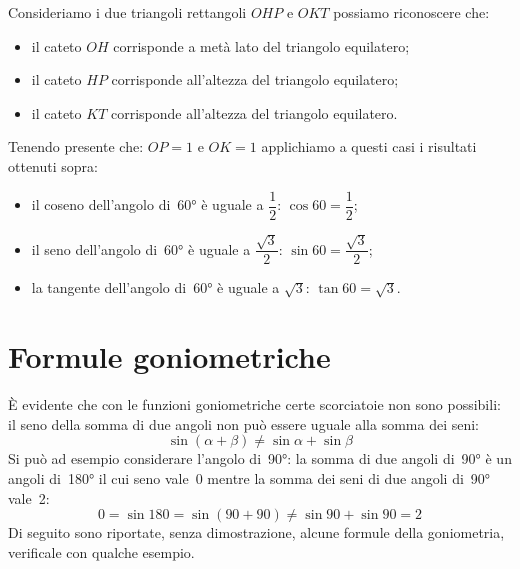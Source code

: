  \begin{minipage}{.45\textwidth}
  \begin{center}
\begin{inaccessibleblock}
\angolosessanta
%     
\end{inaccessibleblock}
  \end{center}
 \end{minipage}
 \begin{minipage}{.45\textwidth}
Consideriamo i due triangoli rettangoli \(OHP\) e \(OKT\) possiamo 
riconoscere che:
\begin{itemize} [noitemsep]
 \item il cateto \(OH\) corrisponde a metà lato del triangolo equilatero; 
 \item il cateto \(HP\) corrisponde all'altezza del triangolo equilatero;
 \item il cateto \(KT\) corrisponde all'altezza del triangolo equilatero.\\
\end{itemize}
Tenendo presente che: \(OP=1\) e \(OK=1\) applichiamo a questi casi i 
risultati ottenuti sopra:
\end{minipage}


\begin{itemize} [noitemsep]
 \item il coseno dell'angolo di~60° è uguale a \(\dfrac{1}{2}\): 
  \(\cos 60 = \dfrac{1}{2}\); 
 \item il seno dell'angolo di~60° è uguale a \(\dfrac{\sqrt{3}}{2}\): 
  \(\sin 60 = \dfrac{\sqrt{3}}{2}\); 
 \item la tangente dell'angolo di~60° è uguale a \(\sqrt{3}\): 
  \(\tan 60 = \sqrt{3}\).
\end{itemize}


\section{Formule goniometriche}
\label{sec:gonio_formule}

È evidente che con le funzioni goniometriche certe scorciatoie non sono 
possibili: il seno della somma di due angoli non può essere uguale alla 
somma dei seni:
\vspace{-6pt}
\[\sin \left( \alpha + \beta \right) \ne \sin \alpha + \sin \beta\]
Si può ad esempio considerare l'angolo di~90°: la somma di due angoli di~90° 
è un angoli di~180° il cui seno vale~0 mentre la somma dei seni di  due 
angoli 
di~90° vale~2:
\vspace{-6pt}
\[0 = \sin 180 = \sin \left( 90 + 90 \right) \ne \sin 90 + \sin 90 = 2 \]
Di seguito sono riportate, senza dimostrazione, alcune formule della 
goniometria, verificale con qualche esempio.
\vspace{-6pt}

